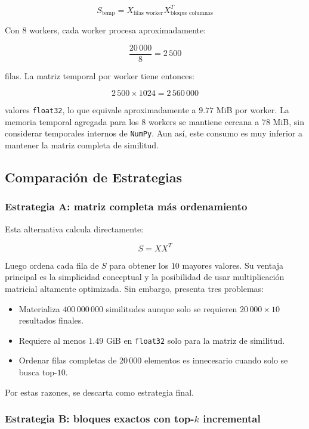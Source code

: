 \documentclass[10pt,a4paper]{article}
\begin{document}
\[
S_{\text{temp}} = X_{\text{filas worker}} X_{\text{bloque columnas}}^T
\]

Con $8$ workers, cada worker procesa aproximadamente:

\[
\frac{20\,000}{8}=2\,500
\]

filas. La matriz temporal por worker tiene entonces:

\[
2\,500 \times 1024 = 2\,560\,000
\]

valores \texttt{float32}, lo que equivale aproximadamente a $9.77$ MiB por
worker. La memoria temporal agregada para los $8$ workers se mantiene cercana a
$78$ MiB, sin considerar temporales internos de \texttt{NumPy}. Aun as\'i, este
consumo es muy inferior a mantener la matriz completa de similitud.

\subsection{Comparaci\'on de Estrategias}

\subsubsection{Estrategia A: matriz completa m\'as ordenamiento}

Esta alternativa calcula directamente:

\[
S = XX^T
\]

Luego ordena cada fila de $S$ para obtener los $10$ mayores valores. Su ventaja
principal es la simplicidad conceptual y la posibilidad de usar multiplicaci\'on
matricial altamente optimizada. Sin embargo, presenta tres problemas:

\begin{itemize}
    \item Materializa $400\,000\,000$ similitudes aunque solo se requieren
        $20\,000 \times 10$ resultados finales.
    \item Requiere al menos $1.49$ GiB en \texttt{float32} solo para la matriz
        de similitud.
    \item Ordenar filas completas de $20\,000$ elementos es innecesario cuando
        solo se busca top-$10$.
\end{itemize}

Por estas razones, se descarta como estrategia final.

\subsubsection{Estrategia B: bloques exactos con top-$k$ incremental}
\end{document}
